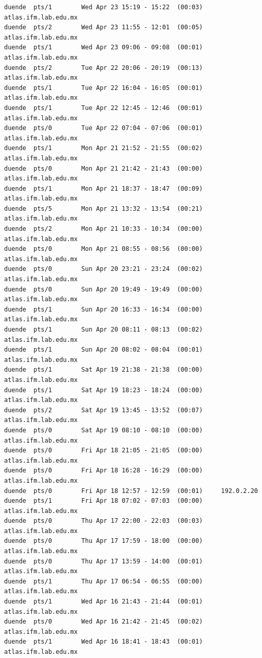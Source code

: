\begin{lstlisting}[style=terminal]
duende  pts/1        Wed Apr 23 15:19 - 15:22  (00:03)     atlas.ifm.lab.edu.mx
duende  pts/2        Wed Apr 23 11:55 - 12:01  (00:05)     atlas.ifm.lab.edu.mx
duende  pts/1        Wed Apr 23 09:06 - 09:08  (00:01)     atlas.ifm.lab.edu.mx
duende  pts/2        Tue Apr 22 20:06 - 20:19  (00:13)     atlas.ifm.lab.edu.mx
duende  pts/1        Tue Apr 22 16:04 - 16:05  (00:01)     atlas.ifm.lab.edu.mx
duende  pts/1        Tue Apr 22 12:45 - 12:46  (00:01)     atlas.ifm.lab.edu.mx
duende  pts/0        Tue Apr 22 07:04 - 07:06  (00:01)     atlas.ifm.lab.edu.mx
duende  pts/1        Mon Apr 21 21:52 - 21:55  (00:02)     atlas.ifm.lab.edu.mx
duende  pts/0        Mon Apr 21 21:42 - 21:43  (00:00)     atlas.ifm.lab.edu.mx
duende  pts/1        Mon Apr 21 18:37 - 18:47  (00:09)     atlas.ifm.lab.edu.mx
duende  pts/5        Mon Apr 21 13:32 - 13:54  (00:21)     atlas.ifm.lab.edu.mx
duende  pts/2        Mon Apr 21 10:33 - 10:34  (00:00)     atlas.ifm.lab.edu.mx
duende  pts/0        Mon Apr 21 08:55 - 08:56  (00:00)     atlas.ifm.lab.edu.mx
duende  pts/0        Sun Apr 20 23:21 - 23:24  (00:02)     atlas.ifm.lab.edu.mx
duende  pts/0        Sun Apr 20 19:49 - 19:49  (00:00)     atlas.ifm.lab.edu.mx
duende  pts/1        Sun Apr 20 16:33 - 16:34  (00:00)     atlas.ifm.lab.edu.mx
duende  pts/1        Sun Apr 20 08:11 - 08:13  (00:02)     atlas.ifm.lab.edu.mx
duende  pts/1        Sun Apr 20 08:02 - 08:04  (00:01)     atlas.ifm.lab.edu.mx
duende  pts/1        Sat Apr 19 21:38 - 21:38  (00:00)     atlas.ifm.lab.edu.mx
duende  pts/1        Sat Apr 19 18:23 - 18:24  (00:00)     atlas.ifm.lab.edu.mx
duende  pts/2        Sat Apr 19 13:45 - 13:52  (00:07)     atlas.ifm.lab.edu.mx
duende  pts/0        Sat Apr 19 08:10 - 08:10  (00:00)     atlas.ifm.lab.edu.mx
duende  pts/0        Fri Apr 18 21:05 - 21:05  (00:00)     atlas.ifm.lab.edu.mx
duende  pts/0        Fri Apr 18 16:28 - 16:29  (00:00)     atlas.ifm.lab.edu.mx
duende  pts/0        Fri Apr 18 12:57 - 12:59  (00:01)     192.0.2.20
duende  pts/1        Fri Apr 18 07:02 - 07:03  (00:00)     atlas.ifm.lab.edu.mx
duende  pts/0        Thu Apr 17 22:00 - 22:03  (00:03)     atlas.ifm.lab.edu.mx
duende  pts/0        Thu Apr 17 17:59 - 18:00  (00:00)     atlas.ifm.lab.edu.mx
duende  pts/0        Thu Apr 17 13:59 - 14:00  (00:01)     atlas.ifm.lab.edu.mx
duende  pts/1        Thu Apr 17 06:54 - 06:55  (00:00)     atlas.ifm.lab.edu.mx
duende  pts/1        Wed Apr 16 21:43 - 21:44  (00:01)     atlas.ifm.lab.edu.mx
duende  pts/0        Wed Apr 16 21:42 - 21:45  (00:02)     atlas.ifm.lab.edu.mx
duende  pts/1        Wed Apr 16 18:41 - 18:43  (00:01)     atlas.ifm.lab.edu.mx

\end{lstlisting}
